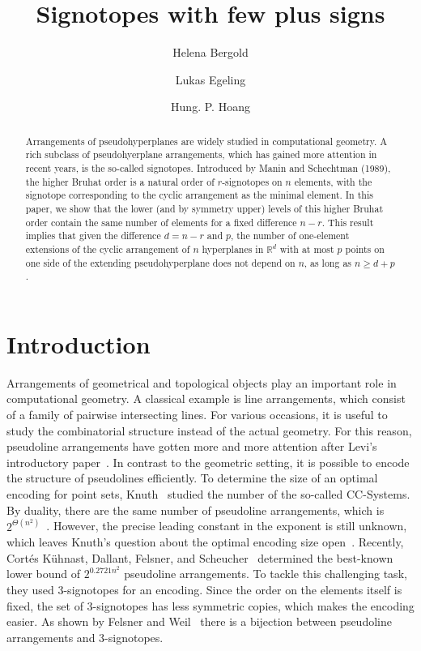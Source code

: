 \documentclass[a4paper,11pt]{amsart}
\title{Signotopes with few plus signs}
\author[H.~Bergold]{Helena Bergold}
\author[L.~Egeling]{Lukas Egeling}
\author[H.~P.~Hoang]{Hung. P. Hoang}
\newcommand{\R}{\mathbb{R}}
\begin{document}
\maketitle

\begin{abstract}
    Arrangements of pseudohyperplanes are widely studied in computational geometry. 
    A rich subclass of pseudohyerplane arrangements, which has gained more attention in recent years, is the so-called signotopes. 
    Introduced by Manin and Schechtman (1989), the higher Bruhat order is a natural order of $r$-signotopes on $n$ elements, with the signotope corresponding to the cyclic arrangement as the minimal element.  
    In this paper, we show that the lower (and by symmetry upper) levels of this higher Bruhat order contain the same number of elements for a fixed difference $n-r$.
    This result implies that given the difference $d=n-r$ and $p$, the number of one-element extensions of the cyclic arrangement of $n$ hyperplanes in $\R^d$ with at most $p$ points on one side of the extending pseudohyperplane does not depend on $n$, as long as $n \geq d + p$. 
\end{abstract}

\section{Introduction}

Arrangements of geometrical and topological objects play an important role in computational geometry. 
A classical example is line arrangements, which consist of a family of pairwise intersecting lines. 
For various occasions, it is useful to study the combinatorial structure instead of the actual geometry. 
For this reason, pseudoline arrangements have gotten more and more attention after Levi's introductory paper~\cite{Levi1926}. 
In contrast to the geometric setting, it is possible to encode the structure of pseudolines efficiently.
To determine the size of an optimal encoding for point sets, Knuth~\cite{Knuth1992} studied the number of the so-called CC-Systems. 
By duality, there are the same number of pseudoline arrangements, which is $2^{\Theta(n^2)}$~\cite{Knuth1992,FelsnerGoodman2017}.
However, the precise leading constant in the exponent is still unknown, which leaves Knuth's question about the optimal encoding size open~\cite{Knuth1992}. 
Recently, Cort\'es Kühnast, Dallant, Felsner, and Scheucher~\cite{KuhnastDFS24} determined the best-known lower bound of $2^{0.2721n^2} $ pseudoline arrangements.
To tackle this challenging task, they used 3-signotopes for an encoding. Since the order on the elements itself is fixed, the set of 3-signotopes has less symmetric copies, which makes the encoding easier. 
As shown by Felsner and Weil~\cite{FelsnerWeil2001} there is a bijection between pseudoline arrangements and 3-signotopes. 
\end{document}
